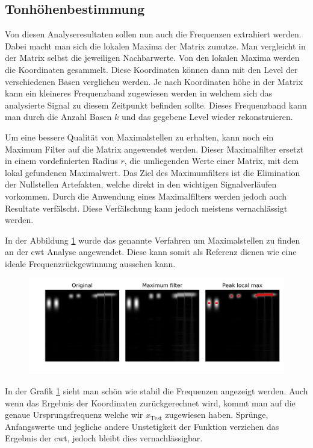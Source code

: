 \subsection{Tonhöhenbestimmung}

Von diesen Analyseresultaten sollen nun auch die Frequenzen extrahiert werden. Dabei macht man sich die lokalen Maxima der Matrix zunutze. Man vergleicht in der Matrix selbst die jeweiligen Nachbarwerte. Von den lokalen Maxima werden die Koordinaten gesammelt. Diese Koordinaten können dann mit den Level der verschiedenen Basen verglichen werden. Je nach Koordinaten höhe in der Matrix kann ein kleineres Frequenzband zugewiesen werden in welchem sich das analysierte Signal zu diesem Zeitpunkt befinden sollte. Dieses Frequenzband kann man durch die Anzahl Basen $k$  und das gegebene Level wieder rekonstruieren.

Um eine bessere Qualität von Maximalstellen zu erhalten, kann noch ein Maximum Filter auf die Matrix angewendet werden. Dieser Maximalfilter ersetzt in einem vordefinierten Radius $r$, die umliegenden Werte einer Matrix, mit dem lokal gefundenen Maximalwert. Das Ziel des Maximumfilters ist die Elimination der Nullstellen Artefakten, welche direkt in den wichtigen Signalverläufen vorkommen. Durch die Anwendung eines Maximalfilters werden jedoch auch Resultate verfälscht. Diese Verfälschung kann jedoch meistens vernachlässigt werden.

In der Abbildung \ref{fig:cwt_max} wurde das genannte Verfahren um Maximalstellen zu finden an der cwt Analyse angewendet. Diese kann somit als Referenz dienen wie eine ideale Frequenzrückgewinnung aussehen kann. 

\begin{figure}[!ht]
	\centering
	\includegraphics[width=\linewidth]{papers/autotune/sections/frames/images/cwtmaxima.jpg}
	\label{fig:cwt_max}
\end{figure}%

In der Grafik \ref{fig:cwt_max} sieht man schön wie stabil die Frequenzen angezeigt werden. Auch wenn das Ergebnis der Koordinaten zurückgerechnet wird, kommt man auf die genaue Ursprungsfrequenz welche wir $x_{\text{Test}}$ zugewiesen haben. Sprünge, Anfangswerte und jegliche andere Unstetigkeit der Funktion verziehen das Ergebnis der cwt, jedoch bleibt dies vernachlässigbar.



